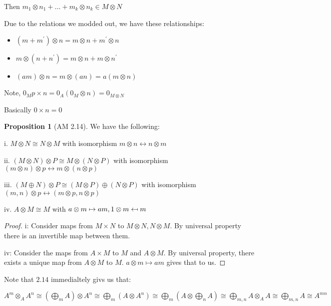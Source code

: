 \documentclass{article}
\theoremstyle{definition}
\newtheorem{proposition}{Proposition}
\begin{document}
Then \(m_1 \otimes n_1 + \dots + m_k \otimes n_k\in M \otimes N\) 

Due to the relations we modded out, we have these relationships:

\begin{itemize}
    \item \((m + m^{\prime}) \otimes n = m\otimes n + m^{\prime} \otimes n\) 
    \item \(m \otimes (n + n^{\prime} ) = m \otimes n + m \otimes n^{\prime} \) 
    \item \((am) \otimes n = m\otimes (an) = a(m \otimes n)\) 
\end{itemize}

Note, \(0_M p\times n = 0_A (0_M \otimes n) = 0_{M \otimes N}\)

Basically \(0 \times n = 0\) 

\begin{proposition}
    [AM 2.14]
    We have the following:

    i. \(M \otimes N \cong N \otimes M\) with isomorphism \(m \otimes n \leftrightarrow n \otimes m\) 

    ii. \((M \otimes N) \otimes P \cong M \otimes (N \otimes P)\) with isomorphism \((m \otimes n) \otimes p \leftrightarrow m \otimes (n \otimes p)\) 

    iii. \((M \oplus N) \otimes P \cong (M \otimes P) \oplus (N \otimes P)\) with isomorphism \((m,n)\otimes p \leftrightarrow (m \otimes p, n \otimes p)\) 

    iv. \(A \otimes M \cong M\) with \(a \otimes m \mapsto am, 1 \otimes m \mathrel{\reflectbox{\ensuremath{\mapsto}}} m\) 
\end{proposition}

\begin{proof}
    i: Consider maps from \(M \times N\) to \(M \otimes N, N \otimes M\). By universal property there is an invertible map between them.

    iv: Consider the maps from \(A \times M\) to \(M \) and \(A \otimes M\). By universal property, there exists a unique map from \(A \otimes M\) to \(M\). \(a \otimes m \mapsto am\) gives that to us.
\end{proof}

Note that \(2.14\) immedialtely givs us that:

\(A^m \otimes _A A^n \cong \left( \bigoplus_{m}^{} A \right) \otimes A^n \cong \bigoplus_{m}^{} (A \otimes A^n)\cong\bigoplus_{m}(A \otimes \bigoplus_{n}A)\cong \bigoplus_{m,n}A \otimes _A A \cong \bigoplus_{m,n} A \cong A^{mn}\) 
\end{document}
